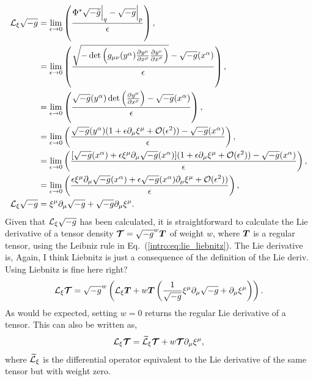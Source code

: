 \begin{align}
\mathcal{L}_\xi \sqrt{-g} &= \lim_{\epsilon\rightarrow 0 }\left( \frac{\Phi^*\sqrt{-\tilde{g}}\Big|_q-\sqrt{-g}\Big|_p}{\epsilon} \right) ,\\
&= \lim_{\epsilon\rightarrow 0 }\left( \frac{\sqrt{-\det\left(g_{\mu\nu}(y^\alpha){\frac{\partial y^\mu}{\partial x^\rho}  \frac{\partial y^\nu}{\partial x^\sigma}}\right)}-\sqrt{-g}(x^\alpha)}{\epsilon} \right) ,\\
&= \lim_{\epsilon\rightarrow 0 }\left( \frac{\sqrt{-g}(y^\alpha) \det\left(\frac{\partial y^\mu}{\partial x^\rho}\right) -\sqrt{-g}(x^\alpha)}{\epsilon} \right) ,\\
&= \lim_{\epsilon\rightarrow 0 }\left( \frac{\sqrt{-g}(y^\alpha) (1 + \epsilon \partial_\mu \xi^\mu + \mathcal{O}(\epsilon^2)) -\sqrt{-g}(x^\alpha)}{\epsilon} \right) ,\\
&= \lim_{\epsilon\rightarrow 0 }\left( \frac{[\sqrt{-g}(x^\alpha) + \epsilon \xi^\mu \partial_\mu \sqrt{-g}(x^\alpha)] (1 + \epsilon \partial_\mu \xi^\mu + \mathcal{O}(\epsilon^2)) -\sqrt{-g}(x^\alpha)}{\epsilon} \right) ,\\
&= \lim_{\epsilon\rightarrow 0 }\left( \frac{ \epsilon \xi^\mu \partial_\mu \sqrt{-g}(x^\alpha) + \epsilon \sqrt{-g}(x^\alpha)\partial_\mu \xi^\mu + \mathcal{O}(\epsilon^2))}{\epsilon}  \right) ,\\
\mathcal{L}_\xi \sqrt{-g} &= \xi^\mu \partial_\mu \sqrt{-g} + \sqrt{-g} \partial_\mu \xi^\mu.
\end{align}
Given that $\mathcal{L}_\xi \sqrt{-g}$ has been calculated, it is straightforward to calculate the Lie derivative of a tensor density $\boldsymbol{\mathcal{T}} = \sqrt{-g}^w\boldsymbol{T}$ of weight $w$, where $\boldsymbol{T}$ is a regular tensor, using the Leibniz rule in Eq.~(\ref{intro:eq:lie_liebnitz}). The Lie derivative is, \color{choral} Again, I think Liebnitz is just a consequence of the definition of the Lie deriv. Using Liebnitz is fine here right?\color{black}
\begin{equation} \label{intro:eq:Ltensordensity}
\mathcal{L}_\xi \boldsymbol{\mathcal{T}} = \sqrt{-g}^w \left( \mathcal{L}_\xi \boldsymbol{T} + w \boldsymbol{T} \left(   \frac{1}{\sqrt{-g}} \xi^\mu \partial_\mu \sqrt{-g} + \partial_\mu \xi^\mu \right) \right).
\end{equation}
As would be expected, setting $w=0$ returns the regular Lie derivative of a tensor. This can also be written as,
\begin{equation} \label{intro:eq:Ltensordensity2}
\mathcal{L}_\xi \boldsymbol{\mathcal{T}} =  \widetilde{\mathcal{L}}_\xi \boldsymbol{\mathcal{T}} + w \boldsymbol{\mathcal{T}}  \partial_\mu \xi^\mu ,
\end{equation}
where $ \widetilde{\mathcal{L}}_\xi$ is the differential operator equivalent to the Lie derivative of the same tensor but with weight zero.





